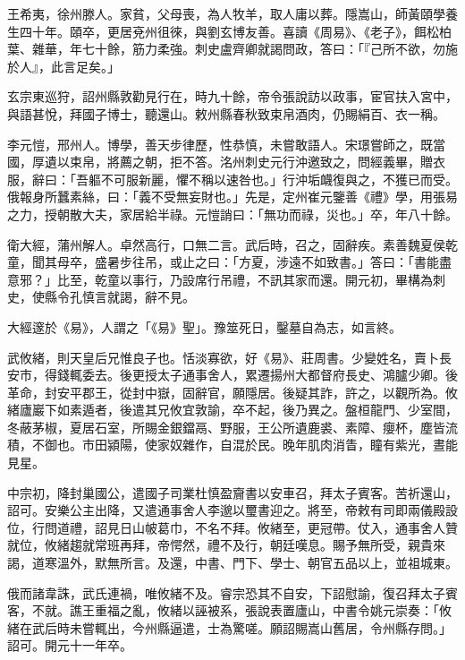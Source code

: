 \begin{pinyinscope}
 王希夷，徐州滕人。家貧，父母喪，為人牧羊，取人庸以葬。隱嵩山，師黃頤學養生四十年。頤卒，更居兗州徂徠，與劉玄博友善。喜讀《周易》、《老子》，餌松柏葉、雜華，年七十餘，筋力柔強。刺史盧齊卿就謁問政，答曰：「『己所不欲，勿施於人』，此言足矣。」



 玄宗東巡狩，詔州縣敦勸見行在，時九十餘，帝令張說訪以政事，宦官扶入宮中，與語甚悅，拜國子博士，聽還山。敕州縣春秋致束帛酒肉，仍賜絹百、衣一稱。



 李元愷，邢州人。博學，善天步律歷，性恭慎，未嘗敢語人。宋璟嘗師之，既當國，厚遺以束帛，將薦之朝，拒不答。洺州刺史元行沖邀致之，問經義畢，贈衣服，辭曰：「吾軀不可服新麗，懼不稱以速咎也。」行沖垢衊復與之，不獲已而受。俄報身所蠶素絲，曰：「義不受無妄財也。」先是，定州崔元鑒善《禮》學，用張易之力，授朝散大夫，家居給半祿。元愷誚曰：「無功而祿，災也。」卒，年八十餘。



 衛大經，蒲州解人。卓然高行，口無二言。武后時，召之，固辭疾。素善魏夏侯乾童，聞其母卒，盛暑步往吊，或止之曰：「方夏，涉遠不如致書。」答曰：「書能盡意邪？」比至，乾童以事行，乃設席行吊禮，不訊其家而還。開元初，畢構為刺史，使縣令孔慎言就謁，辭不見。



 大經邃於《易》，人謂之「《易》聖」。豫筮死日，鑿墓自為志，如言終。



 武攸緒，則天皇后兄惟良子也。恬淡寡欲，好《易》、莊周書。少變姓名，賣卜長安市，得錢輒委去。後更授太子通事舍人，累遷揚州大都督府長史、鴻臚少卿。後革命，封安平郡王，從封中嶽，固辭官，願隱居。後疑其詐，許之，以觀所為。攸緒廬巖下如素遁者，後遣其兄攸宜敦諭，卒不起，後乃異之。盤桓龍門、少室間，冬蔽茅椒，夏居石室，所賜金銀鐺鬲、野服，王公所遺鹿裘、素障、癭杯，塵皆流積，不御也。市田潁陽，使家奴雜作，自混於民。晚年肌肉消眚，瞳有紫光，晝能見星。



 中宗初，降封巢國公，遣國子司業杜慎盈齎書以安車召，拜太子賓客。苦祈還山，詔可。安樂公主出降，又遣通事舍人李邈以璽書迎之。將至，帝敕有司即兩儀殿設位，行問道禮，詔見日山帔葛巾，不名不拜。攸緒至，更冠帶。仗入，通事舍人贊就位，攸緒趨就常班再拜，帝愕然，禮不及行，朝廷嘆息。賜予無所受，親貴來謁，道寒溫外，默無所言。及還，中書、門下、學士、朝官五品以上，並祖城東。



 俄而諸韋誅，武氏連禍，唯攸緒不及。睿宗恐其不自安，下詔慰諭，復召拜太子賓客，不就。譙王重福之亂，攸緒以誣被系，張說表置廬山，中書令姚元崇奏：「攸緒在武后時未嘗輒出，今州縣逼遣，士為驚嗟。願詔賜嵩山舊居，令州縣存問。」詔可。開元十一年卒。




\end{pinyinscope}
